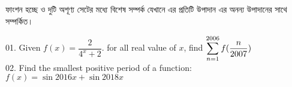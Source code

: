 \documentclass[a4paper,11pt]{article}
\begin{document}
ফাংশন হচ্ছে ও দুটি অশূণ্য সেটের মধ্যে বিশেষ সম্পর্ক যেখানে এর প্রতিটি উপাদান এর অনন্য উপাদানের সাথে সম্পর্কিত। 

01. Given $f(x) = \dfrac{2}{4^{x} + 2}$. for all real value of $x$, find $\mathlarger{\sum\limits_{n=1}^{2006} f(\dfrac{n}{2007})}$\\
02. Find the smallest positive period of a function: $f(x) = \sin2016x + \sin2018x$
\end{document}
